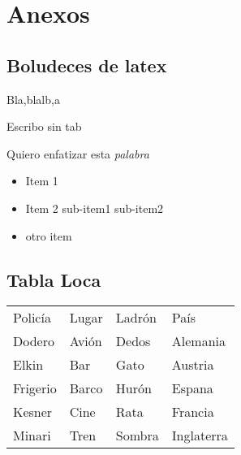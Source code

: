 \section{Anexos}

\subsection{Boludeces de latex}

Bla,blalb,a

\begin{flushleft}
Escribo sin tab
\end{flushleft}
Quiero enfatizar esta \emph{palabra}
\begin{itemize}
\item Item 1
\item Item 2
\subitem sub-item1
\subitem sub-item2
\item otro item
\end{itemize}

\subsection{Tabla Loca}

\begin{center} %
\begin{tabularx}{0.97\linewidth}{XXXX} %

Policía &	Lugar	&	Ladrón	&	País		\\
Dodero	&	Avión	&	Dedos	&	Alemania	\\
Elkin	&	Bar	&	Gato	&	Austria		\\
Frigerio&	Barco	&	Hurón	&	Espana		\\
Kesner	&	Cine	&	Rata	&	Francia		\\
Minari	&	Tren	&	Sombra	&	Inglaterra	\\

\end{tabularx}
\end{center}
